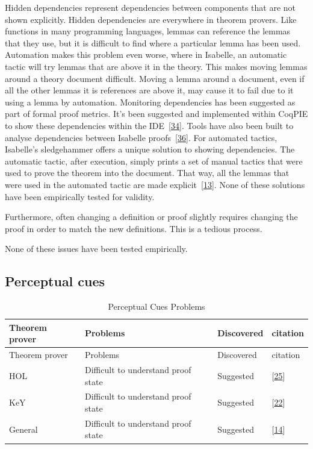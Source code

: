 \documentclass[
]{article}
\begin{document}
Hidden dependencies represent dependencies between components that are
not shown explicitly. Hidden dependencies are everywhere in theorem
provers. Like functions in many programming languages, lemmas can
reference the lemmas that they use, but it is difficult to find where a
particular lemma has been used. Automation makes this problem even
worse, where in Isabelle, an automatic tactic will try lemmas that are
above it in the theory. This makes moving lemmas around a theory
document difficult. Moving a lemma around a document, even if all the
other lemmas it is references are above it, may cause it to fail due to
it using a lemma by automation. Monitoring dependencies has been
suggested as part of formal proof metrics. It's been suggested and
implemented within CoqPIE to show these dependencies within the
IDE~{[}\protect\hyperlink{ref-roe_coqpie_2016}{34}{]}. Tools have also
been built to analyse dependencies between Isabelle
proofs~{[}\protect\hyperlink{ref-spichkova_human-centred_2017}{36}{]}.
For automated tactics, Isabelle's sledgehammer offers a unique solution
to showing dependencies. The automatic tactic, after execution, simply
prints a set of manual tactics that were used to prove the theorem into
the document. That way, all the lemmas that were used in the automated
tactic are made
explicit~{[}\protect\hyperlink{ref-bourke_challenges_2012}{13}{]}. None
of these solutions have been empirically tested for validity.

Furthermore, often changing a definition or proof slightly requires
changing the proof in order to match the new definitions. This is a
tedious process.

None of these issues have been tested empirically.

\hypertarget{perceptual-cues-1}{%
\subsection{Perceptual cues}\label{perceptual-cues-1}}

\hypertarget{tbl:perceptual_cues}{}
\begin{longtable}[]{@{}llll@{}}
\caption{\label{tbl:perceptual_cues}Perceptual Cues
Problems}\tabularnewline
\toprule
Theorem prover & Problems & Discovered & citation \\
\midrule
\endfirsthead
\toprule
Theorem prover & Problems & Discovered & citation \\
\midrule
\endhead
HOL & Difficult to understand proof state & Suggested &
{[}\protect\hyperlink{ref-kadoda_cognitive_2000}{25}{]} \\
KeY & Difficult to understand proof state & Suggested &
{[}\protect\hyperlink{ref-hentschel_integrating_2016}{22}{]} \\
General & Difficult to understand proof state & Suggested &
{[}\protect\hyperlink{ref-eastaughffe_support_1998}{14}{]} \\
\bottomrule
\end{longtable}
\end{document}

